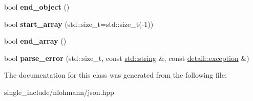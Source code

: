 \begin{DoxyCompactItemize}
\item 
\mbox{\label{classnlohmann_1_1detail_1_1json__sax__acceptor_a919645fd1827a561a994d70a435e3f19}} 
bool {\bfseries end\+\_\+object} ()
\item 
\mbox{\label{classnlohmann_1_1detail_1_1json__sax__acceptor_a8238e8090cbb4ed8a22cbc97bfb833a5}} 
bool {\bfseries start\+\_\+array} (std\+::size\+\_\+t=std\+::size\+\_\+t(-\/1))
\item 
\mbox{\label{classnlohmann_1_1detail_1_1json__sax__acceptor_a22ef94ca5476a9563dcaca15b7d6e654}} 
bool {\bfseries end\+\_\+array} ()
\item 
\mbox{\label{classnlohmann_1_1detail_1_1json__sax__acceptor_a95bb3e8b6feaa523ecda8106fb5e38e3}} 
bool {\bfseries parse\+\_\+error} (std\+::size\+\_\+t, const \hyperlink{namespacenlohmann_1_1detail_a1ed8fc6239da25abcaf681d30ace4985ab45cffe084dd3d20d928bee85e7b0f21}{std\+::string} \&, const \hyperlink{classnlohmann_1_1detail_1_1exception}{detail\+::exception} \&)
\end{DoxyCompactItemize}


The documentation for this class was generated from the following file\+:\begin{DoxyCompactItemize}
\item 
single\+\_\+include/nlohmann/json.\+hpp\end{DoxyCompactItemize}
